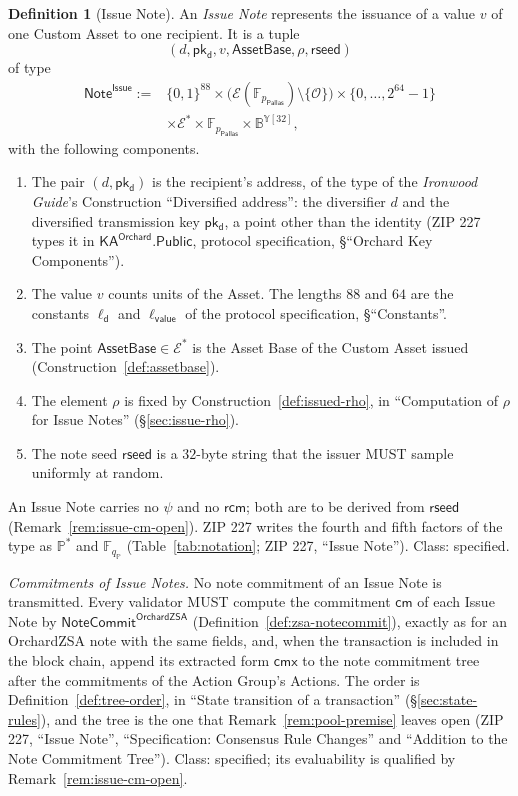 \documentclass[11pt,a4paper]{article}
\theoremstyle{definition}
\newtheorem{definition}[theorem]{Definition}
\newcommand{\F}{\mathbb{F}}
\newcommand{\PP}{\mathbb{P}}
\newcommand{\cmsym}{\mathsf{cm}}
\newcommand{\cmx}{\mathsf{cmx}}
\newcommand{\Pallas}{\ensuremath{\mathsf{Pallas}}}
\newcommand{\Ep}{\ensuremath{\mathcal{E}}}
\newcommand{\NoteCommit}{\ensuremath{\mathsf{NoteCommit}}}
\newcommand{\pkd}{\ensuremath{\mathsf{pk_d}}}
\newcommand{\rcm}{\ensuremath{\mathsf{rcm}}}
\begin{document}
\begin{definition}[Issue Note]\label{def:issue-note}
An \emph{Issue Note} represents the issuance of a value $v$ of one Custom
Asset to one recipient. It is a tuple
\[
  (d, \pkd, v, \mathsf{AssetBase}, \rho, \mathsf{rseed})
\]
of type
\begin{align*}
  \mathsf{Note}^{\mathsf{Issue}} := {}&
    \{0,1\}^{88} \times \bigl(\Ep(\F_{p_{\Pallas}}) \setminus
    \{\mathcal{O}\}\bigr) \times \{0, \dots, 2^{64} - 1\} \\
  &\times \Ep^{*} \times \F_{p_{\Pallas}} \times
    \mathbb{B}^{\mathbb{Y}[32]},
\end{align*}
with the following components.
\begin{enumerate}
\item The pair $(d, \pkd)$ is the recipient's address, of the type of the
  \emph{Ironwood Guide}'s Construction ``Diversified address'': the
  diversifier $d$ and the diversified transmission key $\pkd$, a point
  other than the identity (ZIP 227 types it in
  $\mathsf{KA}^{\mathsf{Orchard}}.\mathsf{Public}$, protocol specification,
  \S``Orchard Key Components'').
\item The value $v$ counts units of the Asset. The lengths $88$ and $64$
  are the constants $\ell_{\mathsf{d}}$ and $\ell_{\mathsf{value}}$ of the
  protocol specification, \S``Constants''.
\item The point $\mathsf{AssetBase} \in \Ep^{*}$ is the Asset Base of the
  Custom Asset issued (Construction~\ref{def:assetbase}).
\item The element $\rho$ is fixed by Construction~\ref{def:issued-rho}, in
  ``Computation of $\rho$ for Issue Notes'' (\S\ref{sec:issue-rho}).
\item The note seed $\mathsf{rseed}$ is a $32$-byte string that the issuer
  MUST sample uniformly at random.
\end{enumerate}
An Issue Note carries no $\psi$ and no $\rcm$; both are to be derived from
$\mathsf{rseed}$ (Remark~\ref{rem:issue-cm-open}). ZIP 227 writes the fourth
and fifth factors of the type as $\PP^{*}$ and $\F_{q_{\PP}}$
(Table~\ref{tab:notation}; ZIP 227, ``Issue Note''). Class: specified.
\end{definition}

\emph{Commitments of Issue Notes.} No note commitment of an Issue Note is
transmitted. Every validator MUST compute the commitment $\cmsym$ of each
Issue Note by $\NoteCommit^{\mathsf{OrchardZSA}}$
(Definition~\ref{def:zsa-notecommit}), exactly as for an OrchardZSA note
with the same fields, and, when the transaction is included in the block
chain, append its extracted form $\cmx$ to the note commitment tree after
the commitments of the Action Group's Actions. The order is
Definition~\ref{def:tree-order}, in ``State transition of a transaction''
(\S\ref{sec:state-rules}), and the tree is the one that
Remark~\ref{rem:pool-premise} leaves open (ZIP 227, ``Issue Note'',
``Specification: Consensus Rule Changes'' and ``Addition to the Note
Commitment Tree''). Class: specified; its evaluability is qualified by
Remark~\ref{rem:issue-cm-open}.
\end{document}
